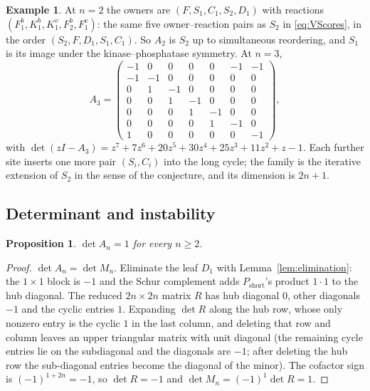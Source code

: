 \documentclass[11pt,a4paper]{article}
\theoremstyle{plain}
\newtheorem{proposition}[theorem]{Proposition}
\theoremstyle{definition}
\newtheorem{example}[theorem]{Example}
\theoremstyle{remark}
\begin{document}
\begin{example}
At $n=2$ the owners are $(F,S_1,C_1,S_2,D_1)$ with reactions $(F_1^b,K_1^b,K_1^v,F_2^b,F_1^v)$: the same five owner--reaction pairs as $S_2$ in \eqref{eq:VScores}, in the order $(S_2,F,D_1,S_1,C_1)$. So $A_2$ is $S_2$ up to simultaneous reordering, and $S_1$ is its image under the kinase--phosphatase symmetry. At $n=3$,
\[
A_3=\begin{pmatrix}
-1&0&0&0&0&-1&-1\\
-1&-1&0&0&0&0&0\\
0&1&-1&0&0&0&0\\
0&0&1&-1&0&0&0\\
0&0&0&1&-1&0&0\\
0&0&0&0&1&-1&0\\
1&0&0&0&0&0&-1
\end{pmatrix},
\]
with $\det(zI-A_3)=z^7+7z^6+20z^5+30z^4+25z^3+11z^2+z-1$.
Each further site inserts one more pair $(S_i,C_i)$ into the long cycle; the family is the iterative extension of $S_2$ in the sense of the conjecture, and its dimension is $2n+1$.
\end{example}

\subsection{Determinant and instability}

\begin{proposition}\label{prop:posdet}
$\det A_n=1$ for every $n\ge2$.
\end{proposition}
\begin{proof}
$\det A_n=\det M_n$. Eliminate the leaf $D_1$ with Lemma~\ref{lem:elimination}: the $1\times1$ block is $-1$ and the Schur complement adds $P_{\text{short}}$'s product $1\cdot1$ to the hub diagonal. The reduced $2n\times2n$ matrix $R$ has hub diagonal $0$, other diagonals $-1$ and the cyclic entries $1$. Expanding $\det R$ along the hub row, whose only nonzero entry is the cyclic $1$ in the last column, and deleting that row and column leaves an upper triangular matrix with unit diagonal (the remaining cycle entries lie on the subdiagonal and the diagonals are $-1$; after deleting the hub row the sub-diagonal entries become the diagonal of the minor). The cofactor sign is $(-1)^{1+2n}=-1$, so $\det R=-1$ and $\det M_n=(-1)^1\det R=1$.
\end{proof}
\end{document}
